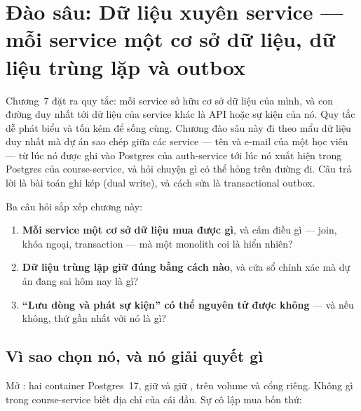 \chapter{Đào sâu: Dữ liệu xuyên service --- mỗi service một cơ sở dữ liệu, dữ liệu trùng lặp và outbox}
\label{ch:dd-consistency}

Chương~7 đặt ra quy tắc: mỗi service sở hữu cơ sở dữ liệu của mình, và
con đường duy nhất tới dữ liệu của service khác là API hoặc sự kiện của
nó. Quy tắc dễ phát biểu và tốn kém để sống cùng. Chương đào sâu này đi
theo mẩu dữ liệu duy nhất mà dự án sao chép giữa các service --- tên và
e-mail của một học viên --- từ lúc nó được ghi vào Postgres của
auth-service tới lúc nó xuất hiện trong Postgres của course-service, và
hỏi chuyện gì có thể hỏng trên đường đi. Câu trả lời là bài toán ghi kép
(dual write), và cách sửa là transactional outbox.

Ba câu hỏi sắp xếp chương này:

\begin{enumerate}
  \item \textbf{Mỗi service một cơ sở dữ liệu mua được gì}, và cấm điều
  gì --- join, khóa ngoại, transaction --- mà một monolith coi là hiển
  nhiên?
  \item \textbf{Dữ liệu trùng lặp giữ đúng bằng cách nào}, và cửa sổ
  chính xác mà dự án đang sai hôm nay là gì?
  \item \textbf{``Lưu dòng và phát sự kiện'' có thể nguyên tử được
  không} --- và nếu không, thứ gần nhất với nó là gì?
\end{enumerate}

\section{Vì sao chọn nó, và nó giải quyết gì}

Mở : hai container Postgres~17,
 giữ  và  giữ
, trên volume và cổng riêng. Không gì trong
course-service biết địa chỉ của cái đầu. Sự cô lập mua bốn thứ:

